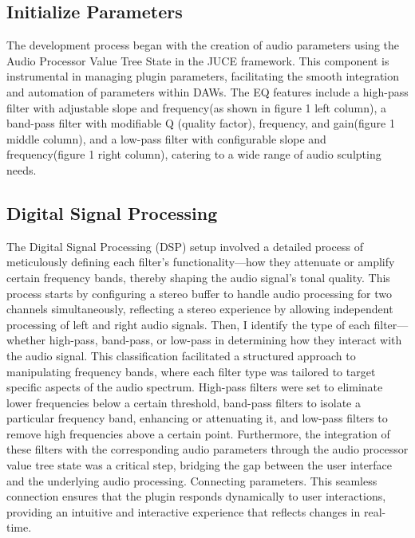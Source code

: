 \documentclass[10pt,twocolumn]{article}
\begin{document}
\subsection{Initialize Parameters}
The development process began with the creation of audio parameters using the Audio Processor Value Tree State in the JUCE framework. This component is instrumental in managing plugin parameters, facilitating the smooth integration and automation of parameters within DAWs. The EQ features include a high-pass filter with adjustable slope and frequency(as shown in figure 1 left column), a band-pass filter with modifiable Q (quality factor), frequency, and gain(figure 1 middle column), and a low-pass filter with configurable slope and frequency(figure 1 right column), catering to a wide range of audio sculpting needs.

\subsection{Digital Signal Processing}
The Digital Signal Processing (DSP) setup involved a detailed process of meticulously defining each filter's functionality—how they attenuate or amplify certain frequency bands, thereby shaping the audio signal's tonal quality. This process starts by configuring a stereo buffer to handle audio processing for two channels simultaneously, reflecting a  stereo experience by allowing independent processing of left and right audio signals. Then, I identify the type of each filter—whether high-pass, band-pass, or low-pass in determining how they interact with the audio signal. This classification facilitated a structured approach to manipulating frequency bands, where each filter type was tailored to target specific aspects of the audio spectrum. High-pass filters were set to eliminate lower frequencies below a certain threshold, band-pass filters to isolate a particular frequency band, enhancing or attenuating it, and low-pass filters to remove high frequencies above a certain point. Furthermore, the integration of these filters with the corresponding audio parameters through the audio processor value tree state was a critical step, bridging the gap between the user interface and the underlying audio processing. Connecting parameters. This seamless connection ensures that the plugin responds dynamically to user interactions, providing an intuitive and interactive experience that reflects changes in real-time.
\end{document}
